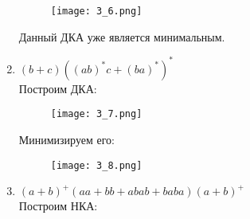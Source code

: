 \documentclass[12pt, a4paper]{article}
\begin{document}
\begin{enumerate}
    \begin{figure}[H]
        \centering
        \texttt{[image: 3\_6.png]}
    \end{figure}
    
Данный ДКА уже является минимальным.

    \item \((b+c)((ab)^*c+(ba)^*)^*\)
\\Построим ДКА:

\begin{comment}
digraph {
    rankdir="LR"
    "" [shape=point]
    q1 [shape=circle]
    q2 [shape=circle]
    q3 [shape=circle]
    q4 [shape=circle]
    q5 [shape=circle]
    q6 [shape=doublecircle]
    q7 [shape=doublecircle]

    "" -> q1
    q1 -> q2 [label="b,c"]
    q2 -> q3 [label="a"]
    q2 -> q4 [label="b"]
    q3 -> q5 [label="b"]
    q4 -> q6 [label="a"]
    q5 -> q3 [label="a"]
    q5 -> q7 [label="c"]
    q6 -> q4 [label="b"]
    q6 -> q3 [label="a"]
    q7 -> q3 [label="a"]
    q7 -> q4 [label="b"]
}
\end{comment}

    \begin{figure}[H]
        \centering
        \texttt{[image: 3\_7.png]}
    \end{figure}

Минимизируем его:

\begin{comment}
digraph {
    rankdir="LR"
    "" [shape=point]
    q1 [shape=circle]
    q2 [shape=circle]
    q3 [shape=circle]
    q4 [shape=circle]
    q5 [shape=circle]
    q6q7 [shape=doublecircle]

    "" -> q1
    q1 -> q2 [label="b,c"]
    q2 -> q3 [label="a"]
    q2 -> q4 [label="b"]
    q3 -> q5 [label="b"]
    q5 -> q3 [label="a"]
    q4 -> q6q7 [label="a"]
    q5 -> q6q7 [label="c"]
    q6q7 -> q3 [label="a"]
    q6q7 -> q4 [label="b"]
}
\end{comment}

    \begin{figure}[H]
        \centering
        \texttt{[image: 3\_8.png]}
    \end{figure}


    \item \((a+b)^+(aa+bb+abab+baba)(a+b)^+\)
\\Построим НКА:


\end{enumerate}
\end{document}
